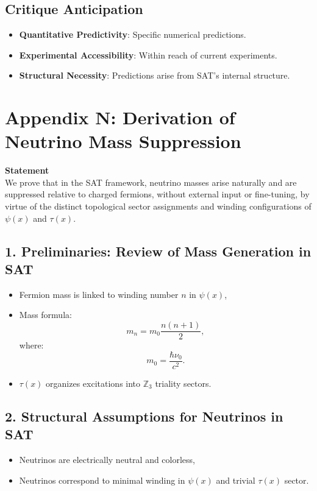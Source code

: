 \documentclass[12pt]{article}
\begin{document}
\subsection*{Critique Anticipation}
\begin{itemize}
    \item \textbf{Quantitative Predictivity}: Specific numerical predictions.
    \item \textbf{Experimental Accessibility}: Within reach of current experiments.
    \item \textbf{Structural Necessity}: Predictions arise from SAT’s internal structure.
\end{itemize}
\newpage
\section*{Appendix N: Derivation of Neutrino Mass Suppression}

\textbf{Statement} \\
We prove that in the SAT framework, neutrino masses arise naturally and are suppressed relative to charged fermions, without external input or fine-tuning, by virtue of the distinct topological sector assignments and winding configurations of \(\psi(x)\) and \(\tau(x)\).

\subsection*{1. Preliminaries: Review of Mass Generation in SAT}
\begin{itemize}
    \item Fermion mass is linked to winding number \(n\) in \(\psi(x)\),
    \item Mass formula:
    \[
    m_n = m_0 \frac{n(n+1)}{2},
    \]
    where:
    \[
    m_0 = \frac{\hbar \nu_0}{c^2}.
    \]
    \item \(\tau(x)\) organizes excitations into \(\mathbb{Z}_3\) triality sectors.
\end{itemize}

\subsection*{2. Structural Assumptions for Neutrinos in SAT}
\begin{itemize}
    \item Neutrinos are electrically neutral and colorless,
    \item Neutrinos correspond to minimal winding in \(\psi(x)\) and trivial \(\tau(x)\) sector.
\end{itemize}
\end{document}
